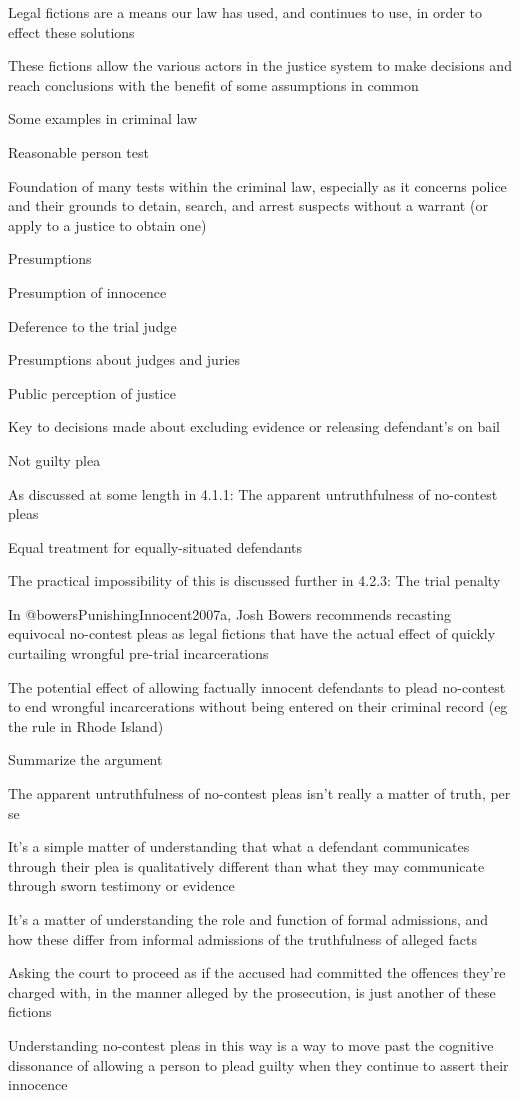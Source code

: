 Legal fictions are a means our law has used, and continues to use, in order to effect these solutions

These fictions allow the various actors in the justice system to make decisions and reach conclusions with the benefit of some assumptions in common

Some examples in criminal law

Reasonable person test

Foundation of many tests within the criminal law, especially as it concerns police and their grounds to detain, search, and arrest suspects without a warrant (or apply to a justice to obtain one)

Presumptions

Presumption of innocence

Deference to the trial judge

Presumptions about judges and juries

Public perception of justice

Key to decisions made about excluding evidence or releasing defendant's on bail

Not guilty plea

As discussed at some length in 4.1.1: The apparent untruthfulness of no-contest pleas

Equal treatment for equally-situated defendants

The practical impossibility of this is discussed further in 4.2.3: The trial penalty

In @bowersPunishingInnocent2007a, Josh Bowers recommends recasting equivocal no-contest pleas as legal fictions that have the actual effect of quickly curtailing wrongful pre-trial incarcerations

The potential effect of allowing factually innocent defendants to plead no-contest to end wrongful incarcerations without being entered on their criminal record (eg the rule in Rhode Island)

Summarize the argument

The apparent untruthfulness of no-contest pleas isn't really a matter of truth, per se

It's a simple matter of understanding that what a defendant communicates through their plea is qualitatively different than what they may communicate through sworn testimony or evidence

It's a matter of understanding the role and function of formal admissions, and how these differ from informal admissions of the truthfulness of alleged facts

Asking the court to proceed as if the accused had committed the offences they're charged with, in the manner alleged by the prosecution, is just another of these fictions

Understanding no-contest pleas in this way is a way to move past the cognitive dissonance of allowing a person to plead guilty when they continue to assert their innocence